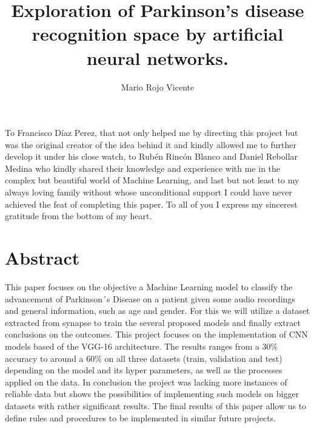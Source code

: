 \documentclass[12pt, a4paper]{article}
\title{Exploration of Parkinson's disease recognition space by artificial neural networks.}
\author{Mario Rojo Vicente}
\date{}	 							%
\begin{document}
	
	 
	
	\section*{}
	\begin{flushleft}
		\vspace*{\fill}
		To Francisco Díaz Perez, that not only helped me by directing this project but was the original creator of the idea behind it and kindly allowed me to further develop it under his close watch, to Rubén Rincón Blanco and Daniel Rebollar Medina who kindly shared their knowledge and experience with me in the complex but beautiful world of Machine Learning, and last but not least to my always loving family without whose unconditional support I could have never achieved the feat of completing this paper. To all of you I express my sincerest gratitude from the bottom of my heart.
		\vspace*{\fill}
		
	\end{flushleft}

	\clearpage
	
	\section*{Abstract}
	
	This paper focuses on the objective a Machine Learning model to classify the advancement of Parkinson´s Disease on a patient given some audio recordings and general information, such as age and gender. For this we will utilize a dataset extracted from synapse to train the several proposed models and finally extract conclusions on the outcomes. This project focuses on the implementation of CNN models based of the VGG-16 architecture. The results ranges from a 30\% accuracy to around a 60\% on all three datasets (train, validation and test) depending on the model and its hyper parameters, as well as the processes applied on the data. In conclusion the project was lacking more instances of reliable data but shows the possibilities of implementing such models on bigger datasets with rather significant results. The final results of this paper allow us to define rules and procedures to be implemented in similar future projects.
	
	
	\clearpage
	
	\tableofcontents
	\listoffigures
	
\end{document}
